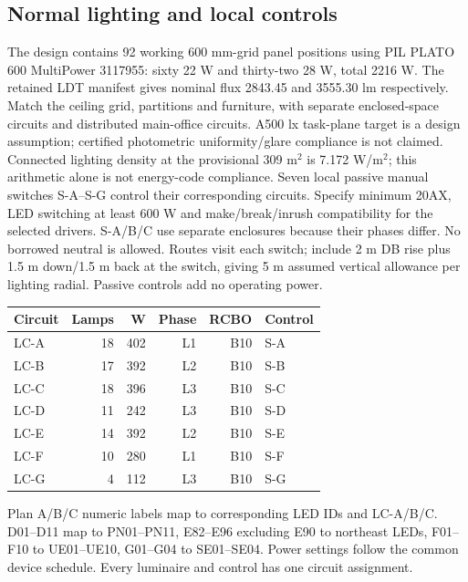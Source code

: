 \documentclass[11pt,a4paper]{article}
\begin{document}
\subsection*{Normal lighting and local controls}
The design contains 92 working 600 mm-grid panel positions using PIL PLATO 600 MultiPower 3117955: sixty 22 W and thirty-two 28 W, total 2216 W. The retained LDT manifest gives nominal flux 2843.45 and 3555.30 lm respectively. Match the ceiling grid, partitions and furniture, with separate enclosed-space circuits and distributed main-office circuits. A500 lx task-plane target is a design assumption;  certified photometric uniformity/glare compliance is not claimed. Connected lighting density at the provisional 309 m$^2$ is 7.172 W/m$^2$;  this arithmetic alone is not energy-code compliance.
Seven local passive manual switches S-A--S-G control their corresponding circuits. Specify minimum 20AX, LED switching at least 600 W and make/break/inrush compatibility for the selected drivers. S-A/B/C use separate enclosures because their phases differ. No borrowed neutral is allowed. Routes visit each switch;  include 2 m DB rise plus 1.5 m down/1.5 m back at the switch, giving 5 m assumed vertical allowance per lighting radial. Passive controls add no operating power.
\begin{center}\begin{tabular}{lrrrrl}\toprule
Circuit & Lamps & W & Phase & RCBO & Control\\\midrule

LC-A & 18 & 402 & L1 & B10 & S-A \\
LC-B & 17 & 392 & L2 & B10 & S-B \\
LC-C & 18 & 396 & L3 & B10 & S-C \\
LC-D & 11 & 242 & L3 & B10 & S-D \\
LC-E & 14 & 392 & L2 & B10 & S-E \\
LC-F & 10 & 280 & L1 & B10 & S-F \\
LC-G & 4 & 112 & L3 & B10 & S-G \\

\bottomrule\end{tabular}\end{center}
Plan A/B/C numeric labels map to corresponding LED IDs and LC-A/B/C. D01--D11 map to PN01--PN11, E82--E96 excluding E90 to northeast LEDs, F01--F10 to UE01--UE10, G01--G04 to SE01--SE04. Power settings follow the common device schedule. Every luminaire and control has one circuit assignment.
\end{document}
